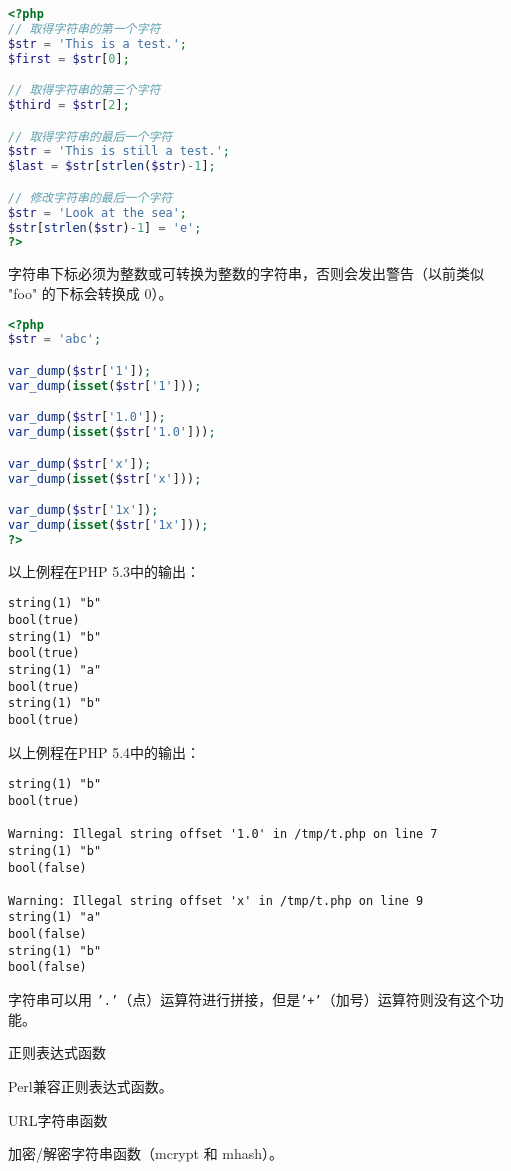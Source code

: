 \begin{lstlisting}[language=PHP]
<?php
// 取得字符串的第一个字符
$str = 'This is a test.';
$first = $str[0];

// 取得字符串的第三个字符
$third = $str[2];

// 取得字符串的最后一个字符
$str = 'This is still a test.';
$last = $str[strlen($str)-1]; 

// 修改字符串的最后一个字符
$str = 'Look at the sea';
$str[strlen($str)-1] = 'e';
?>
\end{lstlisting}

字符串下标必须为整数或可转换为整数的字符串，否则会发出警告（以前类似 "foo" 的下标会转换成 0）。


\begin{lstlisting}[language=PHP]
<?php
$str = 'abc';

var_dump($str['1']);
var_dump(isset($str['1']));

var_dump($str['1.0']);
var_dump(isset($str['1.0']));

var_dump($str['x']);
var_dump(isset($str['x']));

var_dump($str['1x']);
var_dump(isset($str['1x']));
?>
\end{lstlisting}

以上例程在PHP 5.3中的输出：

\begin{verbatim}
string(1) "b"
bool(true)
string(1) "b"
bool(true)
string(1) "a"
bool(true)
string(1) "b"
bool(true)
\end{verbatim}

以上例程在PHP 5.4中的输出：

\begin{verbatim}
string(1) "b"
bool(true)

Warning: Illegal string offset '1.0' in /tmp/t.php on line 7
string(1) "b"
bool(false)

Warning: Illegal string offset 'x' in /tmp/t.php on line 9
string(1) "a"
bool(false)
string(1) "b"
bool(false)
\end{verbatim}

字符串可以用 \texttt{'.'}（点）运算符进行拼接，但是\texttt{'+'}（加号）运算符则没有这个功能。

\begin{compactitem}
\item 正则表达式函数
\item Perl兼容正则表达式函数。
\item URL字符串函数
\item 加密/解密字符串函数（mcrypt 和 mhash）。
\end{compactitem}


